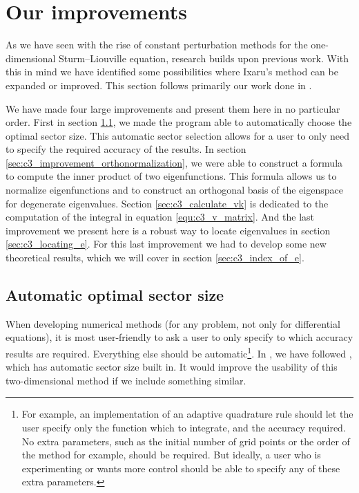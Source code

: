 \section{Our improvements}\label{sec:c3_improvements}

As we have seen with the rise of constant perturbation methods for the one-dimensional Sturm--Liouville equation, research builds upon previous work. With this in mind we have identified some possibilities where Ixaru's method can be expanded or improved. This section follows primarily our work done in \cite{baeyens_fast_2020}.

We have made four large improvements and present them here in no particular order. First in section \ref{sec:c3_improvement_automatic_sectors}, we made the program able to automatically choose the optimal sector size. This automatic sector selection allows for a user to only need to specify the required accuracy of the results. In section \ref{sec:c3_improvement_orthonormalization}, we were able to construct a formula to compute the inner product of two eigenfunctions. This formula allows us to normalize eigenfunctions and to construct an orthogonal basis of the eigenspace for degenerate eigenvalues. Section \ref{sec:c3_calculate_vk} is dedicated to the computation of the integral in equation \eqref{equ:c3_v_matrix}. And the last improvement we present here is a robust way to locate eigenvalues in section \ref{sec:c3_locating_e}. For this last improvement we had to develop some new theoretical results, which we will cover in section \ref{sec:c3_index_of_e}.


\subsection{Automatic optimal sector size}\label{sec:c3_improvement_automatic_sectors}

When developing numerical methods (for any problem, not only for differential equations), it is most user-friendly to ask a user to only specify to which accuracy results are required. Everything else should be automatic\footnote{For example, an implementation of an adaptive quadrature rule should let the user specify only the function which to integrate, and the accuracy required. No extra parameters, such as the initial number of grid points or the order of the method for example, should be required. But ideally, a user who is experimenting or wants more control should be able to specify any of these extra parameters.}. In , we have followed , which has automatic sector size built in. It would improve the usability of this two-dimensional method if we include something similar.


